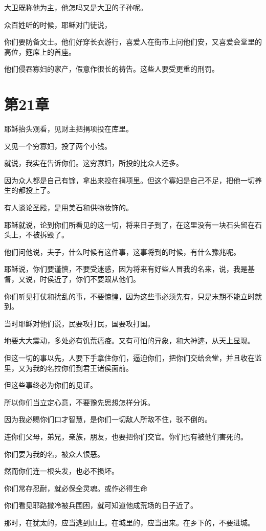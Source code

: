 \documentclass[12pt,oneside]{book}
\begin{document}
大卫既称他为主，他怎吗又是大卫的子孙呢。

众百姓听的时候，耶稣对门徒说，

你们要防备文士。他们好穿长衣游行，喜爱人在街市上问他们安，又喜爱会堂里的高位，筵席上的首座。

他们侵吞寡妇的家产，假意作很长的祷告。这些人要受更重的刑罚。

\chapter{第21章}
耶稣抬头观看，见财主把捐项投在库里。

又见一个穷寡妇，投了两个小钱。

就说，我实在告诉你们。这穷寡妇，所投的比众人还多。

因为众人都是自己有馀，拿出来投在捐项里。但这个寡妇是自己不足，把他一切养生的都投上了。

有人谈论圣殿，是用美石和供物妆饰的。

耶稣就说，论到你们所看见的这一切，将来日子到了，在这里没有一块石头留在石头上，不被拆毁了。

他们问他说，夫子，什么时候有这件事，这事将到的时候，有什么豫兆呢。

耶稣说，你们要谨慎，不要受迷惑，因为将来有好些人冒我的名来，说，我是基督，又说，时侯近了，你们不要跟从他们。

你们听见打仗和扰乱的事，不要惊惶，因为这些事必须先有，只是末期不能立时就到。

当时耶稣对他们说，民要攻打民，国要攻打国。

地要大大震动，多处必有饥荒瘟疫。又有可怕的异象，和大神迹，从天上显现。

但这一切的事以先，人要下手拿住你们，逼迫你们，把你们交给会堂，并且收在监里，又为我的名拉你们到君王诸侯面前。

但这些事终必为你们的见证。

所以你们当立定心意，不要豫先思想怎样分诉。

因为我必赐你们口才智慧，是你们一切敌人所敌不住，驳不倒的。

连你们父母，弟兄，亲族，朋友，也要把你们交官。你们也有被他们害死的。

你们要为我的名，被众人恨恶。

然而你们连一根头发，也必不损坏。

你们常存忍耐，就必保全灵魂。或作必得生命

你们看见耶路撒冷被兵围困，就可知道他成荒场的日子近了。

那时，在犹太的，应当逃到山上。在城里的，应当出来。在乡下的，不要进城。
\end{document}
